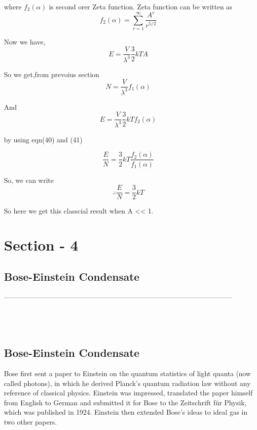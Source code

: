\documentclass[12pt, letterpaper]{article}
\begin{document}
    where $f_{2}(\alpha)$ is second orer Zeta function.
    Zeta function can be written as
    \begin{equation}
        f_{2}(\alpha) = \sum ^{\infty}_{r=1} \frac{A^{r}}{r^{5/2}} 
    \end{equation}

    Now we have,
    \begin{equation}
        E = \frac{V}{\lambda^{3}} \frac{3}{2} kT A \tag*{(when A << 0)}
    \end{equation}

    So we get,from prevoius section
    \begin{equation}
        N = \frac{V}{\lambda^{3} } f_{1}(\alpha) 
    \end{equation}
    
    And
    \begin{equation}
        E = \frac{V}{\lambda^{3}} \frac{3}{2} kT f_{2}(\alpha)
    \end{equation}

    by using eqn(40) and (41)
    
    \begin{equation}
       \frac{E}{N} = \frac{3}{2} kT \frac{f_{2}(\alpha)}{f_{1}(\alpha)}
    \end{equation}

    So, we can write
    \begin{equation}
     \therefore    \frac{E}{N} = \frac{3}{2} kT \tag*{(when A << 1)}
    \end{equation}

    So here we get this classcial result when  A << 1.

    \newpage
    \section*{Section - 4}
    \subsection*{Bose-Einstein Condensate}
    \noindent
    --------------------------------------------------------------------------------------------------- \\ 
    \\
    \\
    \\

    \subsection*{Bose-Einstein Condensate}
    Bose first sent a paper to Einstein on the quantum statistics of light quanta (now called photons), in which he derived Planck's 
    quantum radiation law without any reference of classical physics. Einstein was impressed, translated the paper himself from 
    English to German and submitted it for Bose to the Zeitschrift für Physik, which was published in 1924. 
    Einstein then extended Bose's ideas to ideal gas in two other papers. \\ 
    
\end{document}
